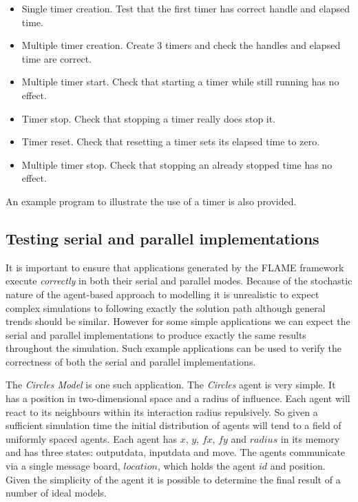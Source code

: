 \begin{itemize}
 \item Single timer creation. Test that the first timer has correct handle and elapsed time.
 \item Multiple timer creation. Create 3 timers and check the handles and elapsed time are correct.
 \item Multiple timer start. Check that starting a timer while still running has no effect.
 \item Timer stop. Check that stopping a timer really does stop it.
 \item Timer reset. Check that resetting a timer sets its elapsed time to zero.
 \item Multiple timer stop. Check that stopping an already stopped time has no effect.
\end{itemize}

An example program to illustrate the use of a timer is also provided.

\subsection{Testing serial and parallel implementations}
It is important to ensure that applications generated by the FLAME framework execute \textsl{correctly} in both their serial and parallel modes. Because of the stochastic nature of the agent-based approach to modelling it is unrealistic to expect complex simulations to following exactly the solution path although general trends should be similar. However for some simple applications we can expect the serial and parallel implementations to produce exactly the same results throughout the simulation. Such example applications can be used to verify the correctness of both the serial and parallel implementations.

The \textsl{Circles Model} is one such application. The \textsl{Circles} agent is very simple. It has a position in two-dimensional space and a radius of influence. Each agent will react to its neighbours within its interaction radius repulsively. So given a sufficient simulation time the initial distribution of agents will tend to a field of uniformly spaced agents. Each agent has $x$, $y$, $fx$, $fy$ and $radius$ in its memory and has three states: outputdata, inputdata and move. The agents communicate via a single message board, $location$, which holds the agent $id$ and position. Given the simplicity of the agent it is possible to determine the final result of a number of ideal models.

